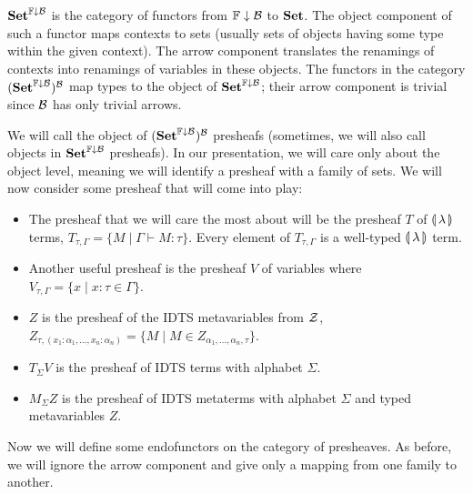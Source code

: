 $\mathbf{Set}^{\mathbb{F}\downarrow\mathcal{B}}$ is the category of functors from ${\mathbb{F}\downarrow\mathcal{B}}$ to
$\mathbf{Set}$. The object component of such a functor maps contexts to sets
(usually sets of objects having some type within the given context). The
arrow component translates the renamings of contexts into renamings of
variables in these objects. The functors in the category
$(\mathbf{Set}^{\mathbb{F}\downarrow\mathcal{B}})^{\mathcal{B}}$ map types to the object of $\mathbf{Set}^{\mathbb{F}\downarrow\mathcal{B}}$; their
arrow component is trivial since $\mathcal{B}$ has only trivial arrows.

We will call the object of $(\mathbf{Set}^{\mathbb{F}\downarrow\mathcal{B}})^{\mathcal{B}}$ presheafs (sometimes, we
will also call objects in $\mathbf{Set}^{\mathbb{F}\downarrow\mathcal{B}}$ presheafs). In our
presentation, we will care only about the object level, meaning we will
identify a presheaf with a family of sets. We will now consider some
presheaf that will come into play:

\begin{itemize}
\item The presheaf that we will care the most about will be the presheaf
  $T$ of $\llparenthesis \, \lambda \, \rrparenthesis$ terms,
  $T_{\tau,\Gamma} = \{ M \mid \Gamma \vdash M : \tau \}$. Every element of
  $T_{\tau,\Gamma}$ is a well-typed $\llparenthesis \, \lambda \, \rrparenthesis$ term.
\item Another useful presheaf is the presheaf $V$ of variables where
  $V_{\tau,\Gamma} = \{x \mid x : \tau \in \Gamma \}$.
\item $Z$ is the presheaf of the IDTS metavariables from $\mathcal{Z}$,
  $Z_{\tau, (x_1 : \alpha_1,\ldots,x_n : \alpha_n)} = \{ M \mid M \in
  Z_{\alpha_1,\ldots,\alpha_n,\tau} \}$.
\item $T_\Sigma V$ is the presheaf of IDTS terms with alphabet $\Sigma$.
\item $M_\Sigma
  Z$ is the presheaf of IDTS metaterms with alphabet
  $\Sigma$ and typed metavariables $Z$.
\end{itemize}

Now we will define some endofunctors on the category of presheaves. As
before, we will ignore the arrow component and give only a mapping from one
family to another.


